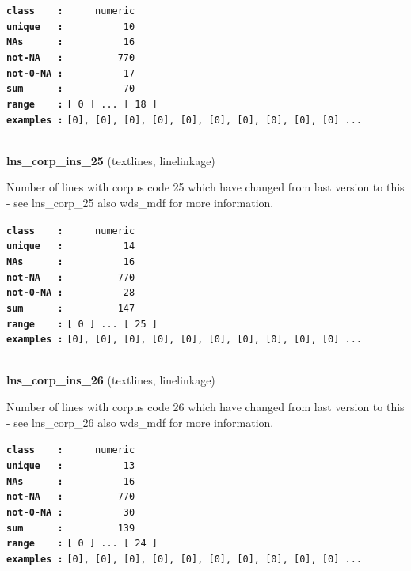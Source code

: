 \documentclass[]{article}
\begin{document}
\textbf{\texttt{class\ \ \ \ :}} \texttt{~~~~~numeric}\\
\textbf{\texttt{unique\ \ \ :}} \texttt{~~~~~~~~~~10}\\
\textbf{\texttt{NAs\ \ \ \ \ \ :}} \texttt{~~~~~~~~~~16}\\
\textbf{\texttt{not-NA\ \ \ :}} \texttt{~~~~~~~~~770}\\
\textbf{\texttt{not-0-NA\ :}} \texttt{~~~~~~~~~~17}\\
\textbf{\texttt{sum\ \ \ \ \ \ :}} \texttt{~~~~~~~~~~70}\\
\textbf{\texttt{range\ \ \ \ :}}
\texttt{{[}\ 0\ {]}\ ...\ {[}\ 18\ {]}}\\
\textbf{\texttt{examples\ :}}
\texttt{{[}0{]},\ {[}0{]},\ {[}0{]},\ {[}0{]},\ {[}0{]},\ {[}0{]},\ {[}0{]},\ {[}0{]},\ {[}0{]},\ {[}0{]}\ ...}\\

~

\textbf{lns\_corp\_ins\_25} (textlines, linelinkage)

Number of lines with corpus code 25 which have changed from last version
to this - see lns\_corp\_25 also wds\_mdf for more information.

\textbf{\texttt{class\ \ \ \ :}} \texttt{~~~~~numeric}\\
\textbf{\texttt{unique\ \ \ :}} \texttt{~~~~~~~~~~14}\\
\textbf{\texttt{NAs\ \ \ \ \ \ :}} \texttt{~~~~~~~~~~16}\\
\textbf{\texttt{not-NA\ \ \ :}} \texttt{~~~~~~~~~770}\\
\textbf{\texttt{not-0-NA\ :}} \texttt{~~~~~~~~~~28}\\
\textbf{\texttt{sum\ \ \ \ \ \ :}} \texttt{~~~~~~~~~147}\\
\textbf{\texttt{range\ \ \ \ :}}
\texttt{{[}\ 0\ {]}\ ...\ {[}\ 25\ {]}}\\
\textbf{\texttt{examples\ :}}
\texttt{{[}0{]},\ {[}0{]},\ {[}0{]},\ {[}0{]},\ {[}0{]},\ {[}0{]},\ {[}0{]},\ {[}0{]},\ {[}0{]},\ {[}0{]}\ ...}\\

~

\textbf{lns\_corp\_ins\_26} (textlines, linelinkage)

Number of lines with corpus code 26 which have changed from last version
to this - see lns\_corp\_26 also wds\_mdf for more information.

\textbf{\texttt{class\ \ \ \ :}} \texttt{~~~~~numeric}\\
\textbf{\texttt{unique\ \ \ :}} \texttt{~~~~~~~~~~13}\\
\textbf{\texttt{NAs\ \ \ \ \ \ :}} \texttt{~~~~~~~~~~16}\\
\textbf{\texttt{not-NA\ \ \ :}} \texttt{~~~~~~~~~770}\\
\textbf{\texttt{not-0-NA\ :}} \texttt{~~~~~~~~~~30}\\
\textbf{\texttt{sum\ \ \ \ \ \ :}} \texttt{~~~~~~~~~139}\\
\textbf{\texttt{range\ \ \ \ :}}
\texttt{{[}\ 0\ {]}\ ...\ {[}\ 24\ {]}}\\
\textbf{\texttt{examples\ :}}
\texttt{{[}0{]},\ {[}0{]},\ {[}0{]},\ {[}0{]},\ {[}0{]},\ {[}0{]},\ {[}0{]},\ {[}0{]},\ {[}0{]},\ {[}0{]}\ ...}\\
\end{document}
